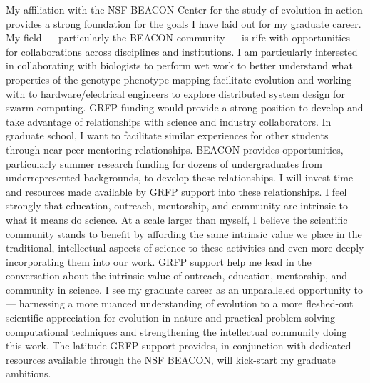 My affiliation with the NSF BEACON Center for the study of evolution in action provides a strong foundation for the goals I have laid out for my graduate career.
My field --- particularly the BEACON community --- is rife with opportunities for collaborations across disciplines and institutions.
I am particularly interested in collaborating with biologists to perform wet work to better understand what properties of the genotype-phenotype mapping facilitate evolution and working with to hardware/electrical engineers to explore distributed system design for swarm computing.
GRFP funding would provide a strong position to develop and take advantage of relationships with science and industry collaborators.
In graduate school, I want to facilitate similar experiences for other students through near-peer mentoring relationships.
BEACON provides opportunities, particularly summer research funding for dozens of undergraduates from underrepresented backgrounds, to develop these relationships.
I will invest time and resources made available by GRFP support into these relationships.
I feel strongly that education, outreach, mentorship, and community are intrinsic to what it means do science.
At a scale larger than myself, I believe the scientific community stands to benefit by affording the same intrinsic value we place in the traditional, intellectual aspects of science to these activities and even more deeply incorporating them into our work.
GRFP support help me lead in the conversation about the intrinsic value of outreach, education, mentorship, and community in science.
I see my graduate career as an unparalleled opportunity to --- harnessing a more nuanced understanding of evolution to a more fleshed-out scientific appreciation for evolution in nature and practical problem-solving computational techniques and strengthening the intellectual community doing this work.
The latitude GRFP support provides, in conjunction with dedicated resources available through the NSF BEACON, will kick-start my graduate ambitions.
